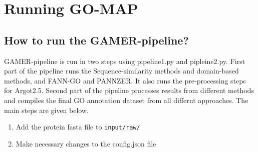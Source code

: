 \section{Running GO-MAP}

\subsection{How to run the
 GAMER-pipeline?}\label{how-to-run-the-gamer-pipeline}

GAMER-pipeline is run in two steps using pipeline1.py and pipleine2.py.
First part of the pipeline runs the Sequence-similarity methods and
domain-based methods, and FANN-GO and PANNZER. It also runs the
pre-processing steps for Argot2.5. Second part of the pipeline processes
results from different methods and compiles the final GO annotation
dataset from all differnt approaches. The main steps are given below.

\begin{enumerate}
 \def\labelenumi{\arabic{enumi}.}

 \item
       Add the protein fasta file to \texttt{input/raw/}
 \item
       Make necessary changes to the config.json file
\end{enumerate}

